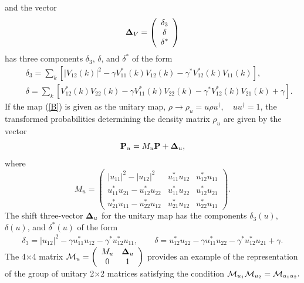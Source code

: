 \documentclass[12pt]{article}
\begin{document}
and the vector
\begin{equation}\label{G}
{\bf \Delta}_V=\left(\begin{array}{ccc}
\delta_3\\ \delta\\ \delta^\ast \end{array}\right)
\end{equation}
has three components $\delta_3$, $\delta$, and $\delta^\ast$ of the
form
\begin{eqnarray*}%
&&\delta_3=\sum_k\left[|V_{12}(k)|^2-\gamma V_{11}^{\ast}(k)V_{12}(k)-\gamma^\ast
V_{12}^{\ast}(k)V_{11}(k)\right],\\
&&\delta=\sum_k\left[V_{12}^{\ast}(k)V_{22}(k) -\gamma
V_{11}^{\ast}(k)V_{22}(k)-\gamma^\ast
V_{12}^{\ast}(k)V_{21}(k)+\gamma\right].
\end{eqnarray*}
If the map (\ref{B}) is given as the unitary map,
$\rho\longrightarrow\rho_u=u\rho u^\dagger,\quad u u^\dagger=1$,
the transformed probabilities determining the density matrix $\rho_u$ are given by the vector
\begin{equation}\label{S}
{\bf P}_u=M_u{\bf P}+{\bf\Delta}_u,
\end{equation}
where
\begin{equation}\label{Z}
M_u=\left(\begin{array}{ccc}
|u_{11}|^2-|u_{12}|^2&u_{11}^{\ast}u_{12}&u_{12}^{\ast}u_{11}\\
u_{11}^{\ast}u_{21}-u_{12}^\ast u_{22}&u_{11}^{\ast}u_{22}&u_{12}^{\ast}u_{21}\\
u_{21}^{\ast}u_{11}-u_{22}^\ast
u_{12}&u_{21}^{\ast}u_{12}&u_{22}^{\ast}u_{11}
\end{array}\right).
\end{equation}
The shift three-vector ${\bf \Delta}_u$ for the unitary map has the
components $\delta_3(u)$, $\delta(u)$, and $\delta^\ast(u)$ of the
form
\begin{eqnarray}\label{Y}
\delta_3=|u_{12}|^2-\gamma u_{11}^{\ast}u_{12}-\gamma^\ast
u_{12}^{\ast}u_{11},\qquad \delta=u_{12}^{\ast}u_{22} -\gamma
u_{11}^{\ast}u_{22}-\gamma^\ast u_{12}^{\ast}u_{21}+\gamma.
\end{eqnarray}
The 4$\times$4 matrix ${\cal M}_u=\left(\begin{array}{cc}M_u&{\bf \Delta}_u\\
0&1\end{array}\right)$ provides an example of the representation of
the group of unitary 2$\times$2 matrices satisfying the condition
${\cal M}_{u_1}{\cal M}_{u_2}={\cal M}_{u_1u_2}.$
\end{document}
